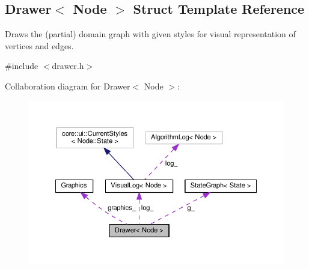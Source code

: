 \hypertarget{structDrawer}{}\subsection{Drawer$<$ Node $>$ Struct Template Reference}
\label{structDrawer}


Draws the (partial) domain graph with given styles for visual representation of vertices and edges.  




{\ttfamily \#include $<$drawer.\+h$>$}



Collaboration diagram for Drawer$<$ Node $>$\+:\nopagebreak
\begin{figure}[H]
\begin{center}
\leavevmode
\includegraphics[width=350pt]{structDrawer__coll__graph}
\end{center}
\end{figure}
